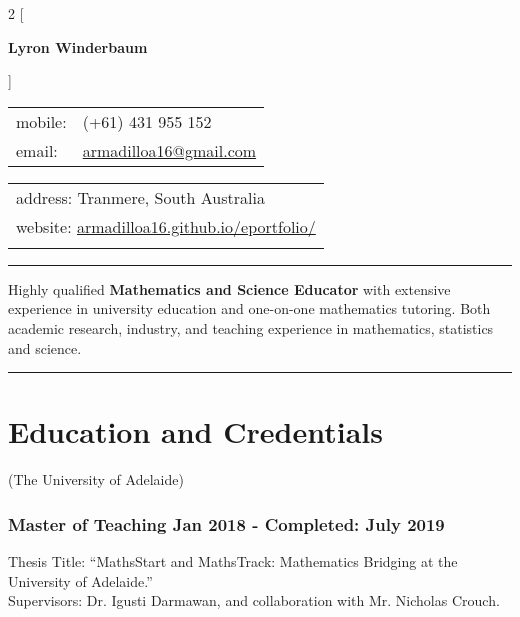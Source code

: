 \documentclass[a4paper,12pt]{report}
\begin{document}
 

\begin{multicols}{2}
[
\begin{center}
{\Large \textbf{Lyron Winderbaum}} \\ \vspace{4mm}
\end{center}
]

\begin{flushleft}
\begin{tabular}{ll}
mobile: & (+61) 431 955 152 \\
email: & \href{mailto:armadilloa16@gmail.com}{armadilloa16@gmail.com} \\
\end{tabular}
\end{flushleft}

\begin{flushright}
\begin{tabular}{l}
address: Tranmere, South Australia \\
website: \href{https://armadilloa16.github.io/eportfolio/}{{\footnotesize armadilloa16.github.io/eportfolio/}} \\
{}
\end{tabular}
\end{flushright}
\end{multicols}                                  

\hrule
\vspace{0.4cm}

Highly qualified \textbf{Mathematics and Science Educator} with extensive experience in university education and one-on-one mathematics tutoring. Both academic research, industry, and teaching experience in mathematics, statistics and science. 

\vspace{0.4cm}
\hrule

\section*{Education and Credentials}
(The University of Adelaide)

\subsubsection*{Master of Teaching \hfill Jan 2018 - Completed: July 2019}
Thesis Title: ``MathsStart and MathsTrack: Mathematics Bridging at the University of Adelaide.'' \\
Supervisors: Dr. Igusti Darmawan, and collaboration with Mr. Nicholas Crouch.
\end{document}
